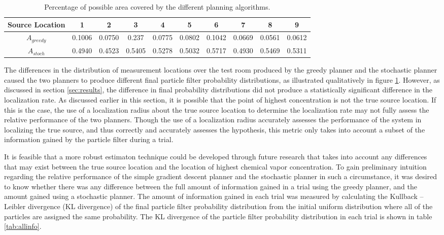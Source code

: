 \documentclass[submit]{aiaa-pretty-modified}
\begin{document}
\begin{table}[htb]
\begin{center}
\begin{tabular}{|c||c||c||c||c||c||c||c||c||c|}
\hline
 Source Location & 1 & 2 & 3 & 4 & 5 & 6 & 7 & 8 & 9 \\
\hline \hline
$A_{greedy}$ & 0.1006 & 0.0750 & 0.237 & 0.0775 & 0.0802 & 0.1042 & 0.0669 & 0.0561 & 0.0612 \\
\hline
$A_{stoch}$ & 0.4940 & 0.4523 & 0.5405 & 0.5278 & 0.5032 & 0.5717 & 0.4930 & 0.5469 & 0.5311 \\
\hline
\end{tabular}
\caption{Percentage of possible area covered by the different planning algorithms.}
\label{tab:paths}
\end{center}
\end{table}

The differences in the distribution of measurement locations over the test room
produced by the greedy planner and the stochastic planner caused the
two planners
to produce different final particle filter probability distributions,
as illustrated qualitatively in figure \ref{tab:paths}.  However, as
discussed in section \ref{sec:results}, the difference in final
probability distributions did not produce a statistically significant
difference in the localization rate.  As discussed earlier in this
section, it is possible that the point of highest concentration is
not the true source location.  If this is the case, the use of a localization radius about
the true source location
to determine the localization rate may not fully assess the
relative performance of the two planners.  Though the use of a
localization radius accurately
assesses the performance of the system in localizing the true source,
and thus correctly and accurately assesses the hypothesis, this metric only takes
into account a subset of the information gained by the particle filter
during a trial.

It is feasible that a more robust estimaton technique could be developed through
future research that takes into account any differences that may exist
between the true source location and the location of highest chemical
vapor concentration.  To gain preliminary intuition regarding the
relative performance of the simple gradient descent planner and the
stochastic planner in such a circumstance, it was desired to know
whether there was any difference between the full amount of information
gained in a trial using the greedy planner, and the amount gained
using a stochastic planner.  The amount of information gained in each
trial was measured by calculating the Kullback – Leibler divergence (KL
divergence) of
the final particle filter probability distribution from the initial
uniform distribution where all of the particles are assigned the same
probability.  The KL divergence of the particle filter probability
distribution in each trial is shown in table \ref{tab:allinfo}.
\end{document}
